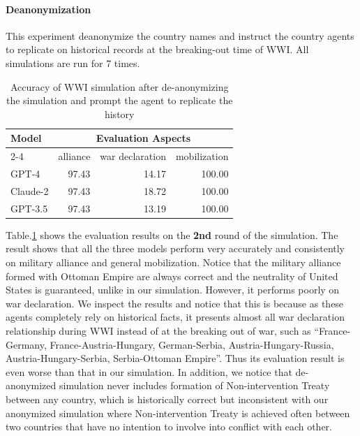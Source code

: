 \documentclass{article}
\begin{document}
\paragraph{Deanonymization} This experiment deanonymize the country names and instruct the country agents to replicate on historical records at the breaking-out time of WWI. All simulations are run for 7 times. 

\begin{table}[!ht]
    \centering
    \begin{tabular}{lrrr}
        \toprule
        \multirow{2}{*}{\bf Model} & \multicolumn{3}{c}{\bf Evaluation Aspects} \\
        \cmidrule(lr){2-4}
        & alliance  & war declaration  & mobilization  \\
        \midrule
        GPT-4 & 97.43 & 14.17& 100.00\\
        \midrule
        Claude-2 & 97.43 & 18.72 & 100.00 \\
        \midrule
        GPT-3.5 & 97.43 & 13.19 & 100.00 \\
        \bottomrule
    \end{tabular}
    \caption{Accuracy of WWI simulation after de-anonymizing the simulation and prompt the agent to replicate the history}
    \label{tab:de-anonymize}
\end{table}

Table.\ref{tab:de-anonymize} shows the evaluation results on the \textbf{2nd} round of the simulation. The result shows that all the three models perform very accurately and consistently on military alliance and general mobilization. Notice that the military alliance formed with Ottoman Empire are always correct and the neutrality of United States is guaranteed, unlike in our simulation. However, it performs poorly on war declaration. We inspect the results and notice that this is because as these agents completely rely on historical facts, it presents almost all war declaration relationship during WWI instead of at the breaking out of war, such as ``France-Germany, France-Austria-Hungary, German-Serbia, Austria-Hungary-Russia, Austria-Hungary-Serbia, Serbia-Ottoman Empire''. Thus its evaluation result is even worse than that in our simulation. In addition, we notice that de-anonymized simulation never includes formation of Non-intervention Treaty between any country, which is historically correct but inconsistent with our anonymized simulation where Non-intervention Treaty is achieved often between two countries that have no intention to involve into conflict with each other.
\end{document}
